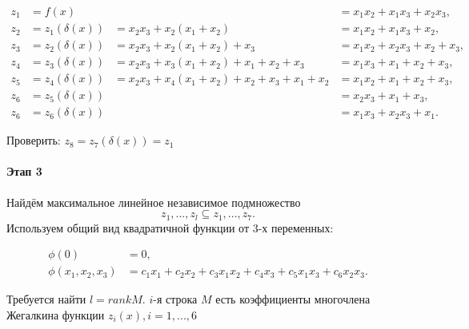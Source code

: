 \documentclass[a4paper,12pt]{article}
\begin{document}
	$$
	\begin{aligned}
		z_1 &= f(x) & &= x_1x_2 + x_1x_3 + x_2x_3,\\
		z_2 &= z_1(\delta(x)) &= x_2x_3 + x_2(x_1 + x_2) &= x_1x_2 + x_1x_3 + x_2,\\
		z_3 &= z_2(\delta(x)) &= x_2x_3 + x_2(x_1 + x_2) + x_3 &= x_1x_2 + x_2x_3 + x_2 + x_3,\\
		z_4 &= z_3(\delta(x)) &= x_2x_3 + x_3(x_1 + x_2) + x_1 + x_2 + x_3 &= x_1x_3 + x_1 + x_2 + x_3,\\
		z_5 &= z_4(\delta(x)) &= x_2x_3 + x_4(x_1 + x_2) + x_2 + x_3 + x_1 + x_2 &= x_1x_2 + x_1 + x_2 + x_3,\\
		z_6 &= z_5(\delta(x)) & &= x_2x_3 + x_1 + x_3,\\
		z_6 &= z_6(\delta(x)) & &= x_1x_3 + x_2x_3 + x_1.
	\end{aligned}
	$$
	
	Проверить: $z_8 = z_7(\delta(x)) = z_1$
	\paragraph{Этап 3}
	Найдём максимальное линейное независимое подмножество \[ {z_1, ..., z_l} \subseteq {z_1, ..., z_7}. \]
	Используем общий вид квадратичной функции от 3-х переменных:
	
	$$
	\begin{aligned}
		\phi(0) &= 0,\\
		\phi(x_1, x_2, x_3) &= c_1x_1 + c_2x_2 + c_3x_1x_2 + c_4x_3 + c_5x_1x_3 + c_6x_2x_3.
	\end{aligned}
	$$
	
	Требуется найти $l = rank M$. $i$-я строка $M$ есть коэффициенты многочлена Жегалкина функции $z_i(x), i = 1, ..., 6$
	
\end{document}
